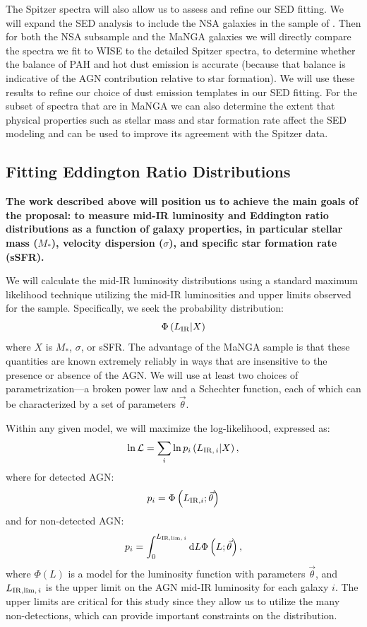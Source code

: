 \documentclass[12pt, preprint]{hacked-aastex}
\begin{document}
The Spitzer spectra will also allow us to assess and refine our SED
fitting. We will expand the SED analysis to include the NSA galaxies
in the sample of \cite{lambrides19a}.  Then for both the NSA subsample
and the MaNGA galaxies we will directly compare the spectra we fit to
WISE to the detailed Spitzer spectra, to determine whether the balance
of PAH and hot dust emission is accurate (because that balance is
indicative of the AGN contribution relative to star formation). We
will use these results to refine our choice of dust emission templates
in our SED fitting. For the subset of spectra that are in MaNGA we can
also determine the extent that physical properties such as stellar
mass and star formation rate affect the SED modeling and can be used
to improve its agreement with the Spitzer data.

\subsection{Fitting Eddington Ratio Distributions}
\label{sec:erd}

{\bf The work described above will position us to achieve the main
  goals of the proposal: to measure mid-IR luminosity and Eddington
  ratio distributions as a function of galaxy properties, in
  particular stellar mass ($M_\ast$), velocity dispersion ($\sigma$),
  and specific star formation rate (sSFR).}

We will calculate the mid-IR luminosity distributions using a standard
maximum likelihood technique utilizing the mid-IR luminosities and
upper limits observed for the sample. Specifically, we seek the
probability distribution:
\begin{equation}
\Phi\left(L_{\rm IR} | X\right)
\end{equation}
where $X$ is $M_\ast$, $\sigma$, or sSFR. The advantage of the MaNGA
sample is that these quantities are known extremely reliably in ways
that are insensitive to the presence or absence of the AGN. We will
use at least two choices of parametrization---a broken power law and a
Schechter function, each of which can be characterized by a set of
parameters $\vec{\theta}$.

Within any given model, we will maximize the log-likelihood, expressed
as:
\begin{equation}
\ln \mathcal{L} = \sum_i \ln p_i\left(L_{{\rm IR},\,i}  | X\right),
\end{equation}
where for detected AGN:
\begin{equation}
p_i = \Phi\left(L_{{\rm IR}, i}; \vec{\theta} \right)
\end{equation}
and for non-detected AGN:
\begin{equation}
p_i = \int_0^{L_{{\rm IR, lim},\,i}} {\rm d}L \Phi\left(L; \vec{\theta}\right),
\end{equation}
where $\Phi(L)$ is a model for the luminosity function with
parameters $\vec{\theta}$, and $L_{{\rm IR, lim},\,i}$ is the upper limit 
on the AGN mid-IR luminosity for each galaxy $i$.
The upper limits are critical for this study since they allow
us to utilize the many non-detections, which can provide important
constraints on the distribution.
\end{document}
